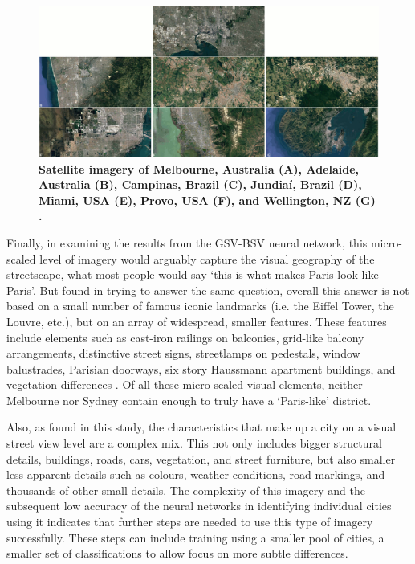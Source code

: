 \documentclass[urbansci,article,submit,moreauthors,pdftex]{Definitions/mdpi}
\begin{document}
\begin{figure}[!htbp]
\centering    
\includegraphics[scale=0.30]{Figure10SatImgs1_3_scaled.png} 
 \caption{\bf Satellite imagery of Melbourne, Australia (A), Adelaide, Australia (B), Campinas, Brazil (C), Jundia\'{i}, Brazil (D), Miami, USA (E), Provo, USA (F), and Wellington, NZ (G) \citep{GoogleStatic2017}.}    
 \label{fig:satimages}  
\end{figure} 

Finally, in examining the results from the GSV-BSV neural network, this micro-scaled level of imagery would arguably capture the visual geography of the streetscape, what most people would say `this is what makes Paris look like Paris'. But \citet{Doersch2012} found in trying to answer the same question, overall this answer is not based on a small number of famous iconic landmarks (i.e. the Eiffel Tower, the Louvre, etc.), but on an array of widespread, smaller features. These features include elements such as cast-iron railings on balconies, grid-like balcony arrangements, distinctive street signs, streetlamps on pedestals, window balustrades, Parisian doorways, six story Haussmann apartment buildings, and vegetation differences \citep{Li2015}. Of all these micro-scaled visual elements, neither Melbourne nor Sydney contain enough to truly have a `Paris-like' district.

Also, as found in this study, the characteristics that make up a city on a visual street view level are a complex mix. This not only includes bigger structural details, buildings, roads, cars, vegetation, and street furniture, but also smaller less apparent details such as colours, weather conditions, road markings, and thousands of other small details. The complexity of this imagery and the subsequent low accuracy of the neural networks in identifying individual cities using it indicates that further steps are needed to use this type of imagery successfully. These steps can include training using a smaller pool of cities, a smaller set of classifications to allow focus on more subtle differences.
\end{document}
